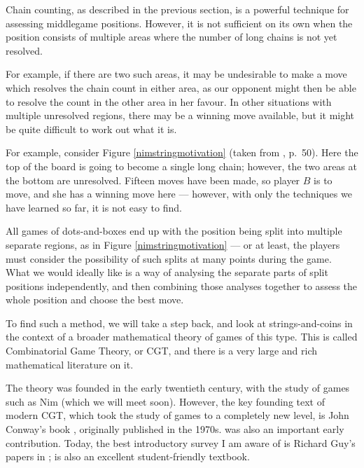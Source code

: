 \documentclass[a4paper,twocolumn]{article}
\begin{document}
Chain counting, as described in the previous section, is a powerful
technique for assessing middlegame positions. However, it is not
sufficient on its own when the position consists of multiple areas
where the number of long chains is not yet resolved.

For example, if there are two such areas, it may be undesirable to
make a move which resolves the chain count in either area, as our
opponent might then be able to resolve the count in the other area in
her favour. In other situations with multiple unresolved regions,
there may be a winning move available, but it might be quite difficult
to work out what it is.

For example, consider Figure \ref{nimstringmotivation} (taken from
\cite{berl}, p.\ 50). Here the top of the board is going to become a
single long chain; however, the two areas at the bottom are
unresolved. Fifteen moves have been made, so player $B$ is to move,
and she has a winning move here --- however, with only the techniques
we have learned so far, it is not easy to find.

\begin{figure*}
  \centering
  \def\svgscale{0.7}
  
  \caption{A $4 \times 5$ dots-and-boxes position with two
    unresolved regions}
  \label{nimstringmotivation}
\end{figure*}

All games of dots-and-boxes end up with the position being split into
multiple separate regions, as in Figure \ref{nimstringmotivation} ---
or at least, the players must consider the possibility of such splits
at many points during the game. What we would ideally like is a way of
analysing the separate parts of split positions independently, and
then combining those analyses together to assess the whole position
and choose the best move.

To find such a method, we will take a step back, and look at
strings-and-coins in the context of a broader mathematical theory of
games of this type. This is called Combinatorial Game Theory,
or CGT, and there is a very large and rich mathematical literature on
it.

The theory was founded in the early twentieth century, with the study
of games such as Nim (which we will meet soon). However, the key
founding text of modern CGT, which took the study of games to a
completely new level, is John Conway's book \cite{onag}, originally
published in the 1970s. \cite{wways} was also an important early
contribution. Today, the best introductory survey I am aware of is
Richard Guy's papers in \cite{nochance}; \cite{lip} is also an
excellent student-friendly textbook.
\end{document}
